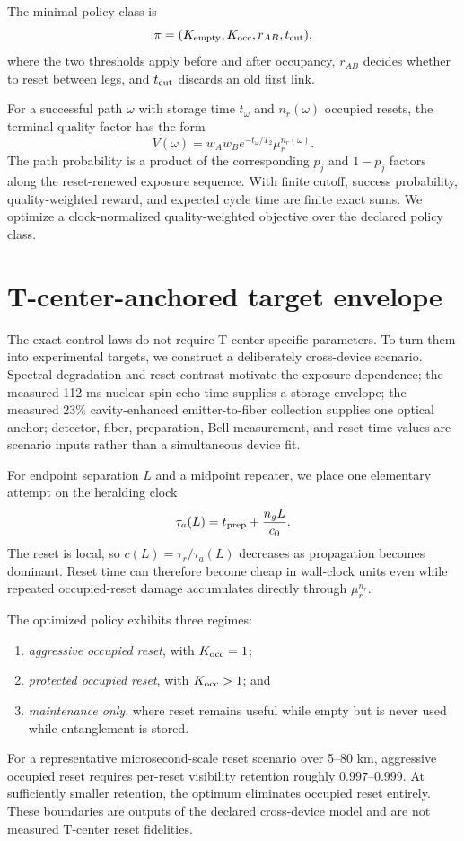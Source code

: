 \documentclass[aps,prx,reprint,superscriptaddress,nofootinbib,longbibliography,floatfix]{revtex4-2}
\begin{document}
The minimal policy class is
\begin{equation}
\pi=(K_{\rm empty},K_{\rm occ},r_{AB},t_{\rm cut}),
\end{equation}
where the two thresholds apply before and after occupancy, $r_{AB}$ decides whether to reset between legs, and $t_{\rm cut}$ discards an old first link.

For a successful path $\omega$ with storage time $t_\omega$ and $n_r(\omega)$ occupied resets, the terminal quality factor has the form
\begin{equation}
V(\omega)=w_Aw_Be^{-t_\omega/T_2}\mu_r^{n_r(\omega)}.
\end{equation}
The path probability is a product of the corresponding $p_j$ and $1-p_j$ factors along the reset-renewed exposure sequence. With finite cutoff, success probability, quality-weighted reward, and expected cycle time are finite exact sums. We optimize a clock-normalized quality-weighted objective over the declared policy class.

\section{T-center-anchored target envelope}
The exact control laws do not require T-center-specific parameters. To turn them into experimental targets, we construct a deliberately cross-device scenario. Spectral-degradation and reset contrast motivate the exposure dependence; the measured 112-ms nuclear-spin echo time supplies a storage envelope; the measured 23\% cavity-enhanced emitter-to-fiber collection supplies one optical anchor; detector, fiber, preparation, Bell-measurement, and reset-time values are scenario inputs rather than a simultaneous device fit.

For endpoint separation $L$ and a midpoint repeater, we place one elementary attempt on the heralding clock
\begin{equation}
\tau_a(L)=t_{\rm prep}+\frac{n_gL}{c_0}.
\end{equation}
The reset is local, so $c(L)=\tau_r/\tau_a(L)$ decreases as propagation becomes dominant. Reset time can therefore become cheap in wall-clock units even while repeated occupied-reset damage accumulates directly through $\mu_r^{n_r}$.

The optimized policy exhibits three regimes:
\begin{enumerate}
\item \emph{aggressive occupied reset}, with $K_{\rm occ}=1$;
\item \emph{protected occupied reset}, with $K_{\rm occ}>1$; and
\item \emph{maintenance only}, where reset remains useful while empty but is never used while entanglement is stored.
\end{enumerate}
For a representative microsecond-scale reset scenario over 5--80 km, aggressive occupied reset requires per-reset visibility retention roughly $0.997$--$0.999$. At sufficiently smaller retention, the optimum eliminates occupied reset entirely. These boundaries are outputs of the declared cross-device model and are not measured T-center reset fidelities.
\end{document}
